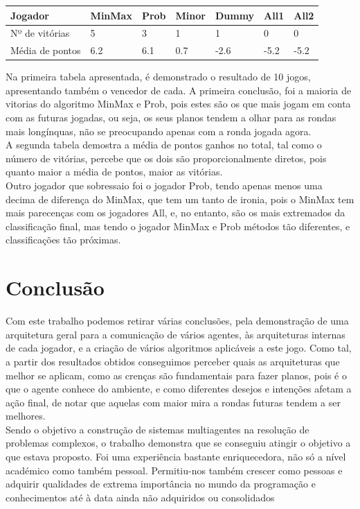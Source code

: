 \documentclass[12pt]{article}
\begin{document}
	
	\begin{center}
	    \begin{tabular}{ |p{4cm}|p{1.5cm}|p{1.5cm}|p{1.5cm}|p{1.5cm}|p{1.5cm}|p{1.5cm}|  }
	    \hline
	    Jogador  & MinMax   & Prob  & Minor & Dummy & All1  & All2\\\hline
	    Nº de vitórias	& 5	    & 3	    & 1	    & 1	    & 0	    & 0\\\hline
        Média de pontos & 6.2   & 6.1   & 0.7	& -2.6	& -5.2	& -5.2\\\hline
	    \end{tabular}
	\end{center}
	
    Na primeira tabela apresentada, é demonstrado o resultado de 10 jogos, apresentando também o vencedor de cada. A primeira conclusão, foi a maioria de vitorias do algoritmo MinMax e Prob, pois estes são os que mais jogam em conta com as futuras jogadas, ou seja, os seus planos tendem a olhar para as rondas mais longínquas, não se preocupando apenas com a ronda jogada agora.\\
    A segunda tabela demostra a média de pontos ganhos no total, tal como o número de vitórias, percebe que os dois são proporcionalmente diretos, pois quanto maior a média de pontos, maior as vitórias.\\
    Outro jogador que sobressaio foi o jogador Prob, tendo apenas menos uma decima de diferença do MinMax, que tem um tanto de ironia, pois o MinMax tem mais parecenças com os jogadores All, e, no entanto, são os mais extremados da classificação final, mas tendo o jogador MinMax e Prob métodos tão diferentes, e classificações tão próximas.\\


	\section*{Conclusão}
    Com este trabalho podemos retirar várias conclusões, pela demonstração de uma arquitetura geral para a comunicação de vários agentes, às arquiteturas internas de cada jogador, e a criação de vários algoritmos aplicáveis a este jogo. Como tal, a partir dos resultados obtidos conseguimos perceber quais as arquiteturas que melhor se aplicam, como as crenças são fundamentais para fazer planos, pois é o que o agente conhece do ambiente, e como diferentes desejos e intenções afetam a ação final, de notar que aquelas com maior mira a rondas futuras tendem a ser melhores.\\
    Sendo o objetivo a construção de sistemas multiagentes na resolução de problemas complexos, o trabalho demonstra que se conseguiu atingir o objetivo a que estava proposto. Foi uma experiência bastante enriquecedora, não só a nível académico como também pessoal. Permitiu-nos também crescer como pessoas e adquirir qualidades de extrema importância no mundo da programação e conhecimentos até à data ainda não adquiridos ou consolidados\\


	
\end{document}
